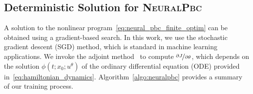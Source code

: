 



\subsection{Deterministic Solution for \textsc{NeuralPbc}} 
\label{sssec:ml-pbc-deterministic}

A solution to the nonlinear program~\eqref{eq:neural_pbc_finite_optim} can be
obtained using a gradient-based search. 
%
In this work, we use the stochastic gradient descent (SGD) method, which is
standard in machine learning applications. 
%
%
We invoke the adjoint method~\cite{chen2018neural} to compute
$\nicefrac{\partial J}{\partial \theta}$, which depends on the solution
$\phi(t;x_0;u^\theta)$ of the ordinary differential equation (ODE)
provided in~\eqref{eq:hamiltonian_dynamics}. 
%
%
Algorithm~\ref{algo:neuralpbc} provides a summary of our training process.

